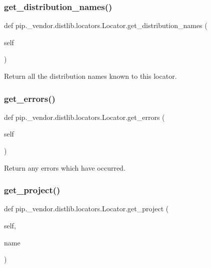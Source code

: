 \subsubsection{\texorpdfstring{get\+\_\+distribution\+\_\+names()}{get\_distribution\_names()}}
{\footnotesize\ttfamily def pip.\+\_\+vendor.\+distlib.\+locators.\+Locator.\+get\+\_\+distribution\+\_\+names (\begin{DoxyParamCaption}\item[{}]{self }\end{DoxyParamCaption})}

\begin{DoxyVerb}Return all the distribution names known to this locator.
\end{DoxyVerb}
 \mbox{\label{classpip_1_1__vendor_1_1distlib_1_1locators_1_1Locator_a001dcda572c307fbc81dc17c1056df8a}} 
\subsubsection{\texorpdfstring{get\+\_\+errors()}{get\_errors()}}
{\footnotesize\ttfamily def pip.\+\_\+vendor.\+distlib.\+locators.\+Locator.\+get\+\_\+errors (\begin{DoxyParamCaption}\item[{}]{self }\end{DoxyParamCaption})}

\begin{DoxyVerb}Return any errors which have occurred.
\end{DoxyVerb}
 \mbox{\label{classpip_1_1__vendor_1_1distlib_1_1locators_1_1Locator_a48d9eb4bd10059daaafb980acd1ece2a}} 
\subsubsection{\texorpdfstring{get\+\_\+project()}{get\_project()}}
{\footnotesize\ttfamily def pip.\+\_\+vendor.\+distlib.\+locators.\+Locator.\+get\+\_\+project (\begin{DoxyParamCaption}\item[{}]{self,  }\item[{}]{name }\end{DoxyParamCaption})}

